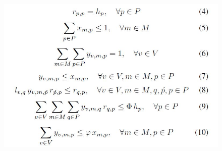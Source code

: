 \begin{figure}[H]
	\centering
	\includegraphics[width=0.7\linewidth]{"figures/math model 2"}
	{\caption*{}}
	\label{}
\end{figure}
